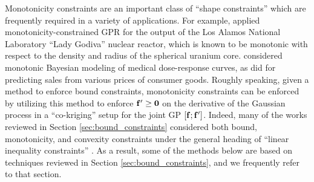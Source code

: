 \label{sec:monotonicity_constraints}
Monotonicity constraints are an important class of ``shape constraints'' which are frequently required in a variety of applications. For example,  applied monotonicity-constrained GPR for the output of the Los Alamos National Laboratory ``Lady Godiva'' nuclear reactor, which is known to be monotonic with respect to the density and radius of the spherical uranium core.  considered monotonic Bayesian modeling of medical dose-response curves, as did  for predicting sales from various prices of consumer goods. 
Roughly speaking, given a method to enforce bound constraints, monotonicity constraints can be enforced by utilizing this method to enforce 
$\bold{f}' \ge \bold{0}$ on the derivative of the Gaussian process in a ``co-kriging'' setup for the joint GP 
$[\bold{f};\bold{f}']$. Indeed, many of the works reviewed in Section \ref{sec:bound_constraints} considered both bound, monotonicity, and convexity constraints under the general heading of ``linear inequality constraints'' . As a result, some of the methods below are based on techniques reviewed in Section \ref{sec:bound_constraints}, and we frequently refer to that section.

